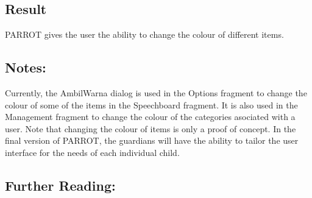 \subsection{Result}
PARROT gives the user the ability to change the colour of different items.\newline

\subsection{Notes:}
Currently, the AmbilWarna dialog is used in the Options fragment %
to change the colour of some of the items in the Speechboard fragment. It is also used in the Management fragment to change the colour of the categories asociated with a user.\newline
Note that changing the colour of items is only a proof of concept. In the final version of PARROT, the guardians will have the ability to tailor the user interface for the needs of each individual child.\newline

\subsection{Further Reading:}
